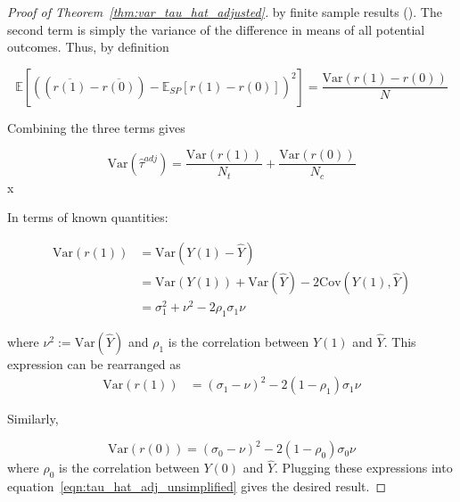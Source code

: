 \documentclass[12pt]{article}
\newcommand{\ex}{\mathbb{E}} %
\newcommand{\var}{\textrm{Var}}
\newcommand{\cov}{\textrm{Cov}}
\begin{document}
\begin{proof}[Proof of Theorem~\ref{thm:var_tau_hat_adjusted}]
\noindent by finite sample results (\cite{imbens_causal_2015}).  The second term is simply the variance of the difference in means of all potential outcomes.  Thus, by definition

$$ \ex\left[ \left( (\overline{r(1)} - \overline{r(0)}) -  \ex_{SP}\left[ r(1) - r(0) \right] \right)^2 \right] = \frac{\var(r(1) - r(0))}{N}$$

\noindent Combining the three terms gives

\begin{equation}\label{eqn:tau_hat_adj_unsimplified}
\var(\hat{\tau}^{adj}) =\frac{\var(r(1))}{N_t} + \frac{\var(r(0))}{N_c}
\end{equation}x

\noindent In terms of known quantities:

\begin{align*}
\var(r(1)) &= \var(Y(1) - \hat{Y}) \\
&= \var(Y(1)) + \var(\hat{Y}) - 2\cov(Y(1), \hat{Y}) \\
&= \sigma_1^2 + \nu^2 - 2 \rho_1 \sigma_1 \nu
\end{align*}

\noindent where $\nu^2 := \var(\hat{Y})$ and $\rho_1$ is the correlation between $Y(1)$ and $\hat{Y}$.
This expression can be rearranged as
\begin{align*}
\var(r(1)) &= (\sigma_1 - \nu)^2 - 2(1-\rho_1)\sigma_1\nu
\end{align*}

\noindent Similarly,

\begin{equation*}
\var(r(0)) =  (\sigma_0 - \nu)^2 - 2(1-\rho_0)\sigma_0\nu
\end{equation*}
\noindent where $\rho_0$ is the correlation between $Y(0)$ and $\hat{Y}$. Plugging these expressions into equation~\ref{eqn:tau_hat_adj_unsimplified} gives the desired result.
\end{proof}
\end{document}
